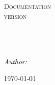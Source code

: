 \begin{fullwidth}
\begin{titlepage}
	\vspace*{\fill}
	\begin{center}
		\textsc{\Large Documentation}\\[0.5cm] %
		\textsc{version \version}\\[0.5cm] %
		\HRule \\[0.4cm]
		{ \huge \bfseries \ttitle}\\[0.4cm] %
		\HRule \\[1.5cm]
		\begin{minipage}{0.4\textwidth}
			\begin{flushleft} \small
				\emph{Author:}\\\textsc{\authornames} %
			\end{flushleft}
		\end{minipage}
		{\large \today}\\[3cm] %
	\end{center}
	\vspace*{\fill}
\end{titlepage}


\end{fullwidth}
